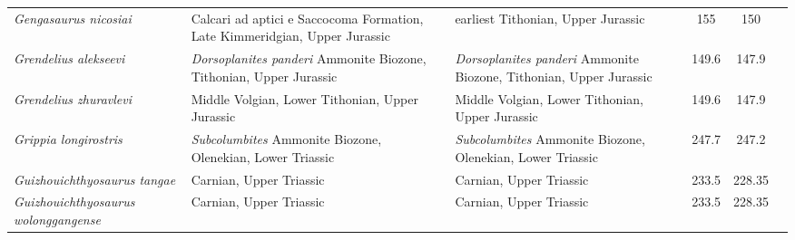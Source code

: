 \begin{longtabu}{>{\itshape}lXXSSl}
	Gengasaurus nicosiai                                 & Calcari ad aptici e Saccocoma Formation, Late Kimmeridgian, Upper Jurassic                                                         & earliest Tithonian, Upper Jurassic                                                                                                 & 155                      & 150                      & \cite{Paparella2016} \\                  
	Grendelius alekseevi                                 & \emph{Dorsoplanites panderi} Ammonite Biozone, Tithonian, Upper Jurassic                                                           & \emph{Dorsoplanites panderi} Ammonite Biozone, Tithonian, Upper Jurassic                                                           & 149.6                    & 147.9                    & \cite{Arkhangelsky2001} \\               
	Grendelius zhuravlevi                                & Middle Volgian, Lower Tithonian, Upper Jurassic                                                                                    & Middle Volgian, Lower Tithonian, Upper Jurassic                                                                                    & 149.6                    & 147.9                    & \cite{Zverkov2015a} \\                   
	Grippia longirostris                                 & \emph{Subcolumbites} Ammonite Biozone, Olenekian, Lower Triassic                                                                   & \emph{Subcolumbites} Ammonite Biozone, Olenekian, Lower Triassic                                                                   & 247.7                    & 247.2                    & \cite{Motani2000} \\                     
	Guizhouichthyosaurus tangae                          & Carnian, Upper Triassic                                                                                                            & Carnian, Upper Triassic                                                                                                            & 233.5                    & 228.35                   & \cite{Pan2006} \\                        
	Guizhouichthyosaurus wolonggangense                  & Carnian, Upper Triassic                                                                                                            & Carnian, Upper Triassic                                                                                                            & 233.5                    & 228.35                   & \cite{Chen2007} \\                       

\end{longtabu}
